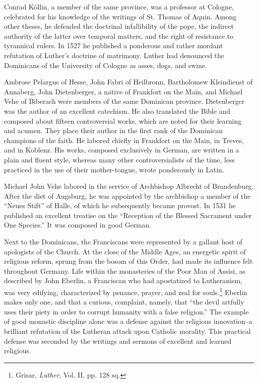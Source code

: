 Conrad Köllin, a member of the same province, was a professor
at Cologne, celebrated for his knowledge of the writings of St.
Thomas of Aquin. Among other theses, he defended the doctrinal
infallibility of the pope, the indirect authority of the latter over temporal
matters, and the right of resistance to tyrannical rulers. In 1527
he published a ponderous and rather mordant refutation of Luther’s
doctrine of matrimony. Luther had denounced the Dominicans of the
University of Cologne as asses, dogs, and swine.

Ambrose Pelargus of Hesse, John Fabri of Heilbronn, Bartholomew
Kleindienst of Annaberg, John Dietenberger, a native of Frankfort
on the Main, and Michael Vehe of Biberach were members of
the same Dominican province. Dietenberger was the author of an
excellent catechism. He also translated the Bible and composed about
fifteen controversial works, which are noted for their learning and
acumen. They place their author in the first rank of the Dominican
champions of the faith. He labored chiefly in Frankfort on the Main,
in Treves, and in Koblenz. His works, composed exclusively in German, are
written in a plain and fluent style, whereas many other
controversialists of the time, less practiced in the use of their mother-tongue,
wrote ponderously in Latin.

Michael John Vehe labored in the service of Archbishop Albrecht
of Brandenburg. After the diet of Augsburg, he was appointed by
the archbishop a member of the “Neues Stift” of Halle, of which he
subsequently became provost. In 1531 he published an excellent treatise
on the “Reception of the Blessed Sacrament under One Species.”
It was composed in good German.

Next to the Dominicans, the Franciscans were represented by a
gallant host of apologists of the Church. At the close of the Middle
Ages, an energetic spirit of religious reform, sprung from the bosom
of this Order, had made its influence felt throughout Germany. Life
within the monasteries of the Poor Man of Assisi, as described by
John Eberlin, a Franciscan who had apostatized to Lutheranism, was
very edifying, characterized by penance, prayer, and zeal for souls.\footnote
{Grisar, \textit{Luther}, Vol. II, pp. 128 sq.}
Eberlin makes only one, and that a curious, complaint, namely, that
“the devil artfully uses their piety in order to corrupt humanity
with a false religion.” The example of good monastic discipline alone
was a defense against the religious innovation--a brilliant refutation
of the Lutheran attack upon Catholic morality. This practical defense was
seconded by the writings and sermons of excellent and
learned religious.

